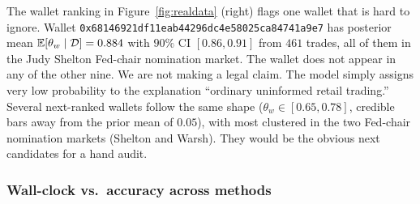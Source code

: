 The wallet ranking in Figure~\ref{fig:realdata} (right) flags one wallet that is hard to ignore. Wallet \texttt{0x68146921df11eab44296dc4e58025ca84741a9e7} has posterior mean $\operatorname{\mathbb{E}}[\theta_w\mid\mathcal{D}] = 0.884$ with $90\%$ CI $[0.86, 0.91]$ from $461$ trades, all of them in the Judy Shelton Fed-chair nomination market. The wallet does not appear in any of the other nine. We are not making a legal claim. The model simply assigns very low probability to the explanation ``ordinary uninformed retail trading.'' Several next-ranked wallets follow the same shape ($\theta_w \in [0.65, 0.78]$, credible bars away from the prior mean of $0.05$), with most clustered in the two Fed-chair nomination markets (Shelton and Warsh). They would be the obvious next candidates for a hand audit.

\subsubsection{Wall-clock vs.\ accuracy across methods}\label{sssec:bench}

